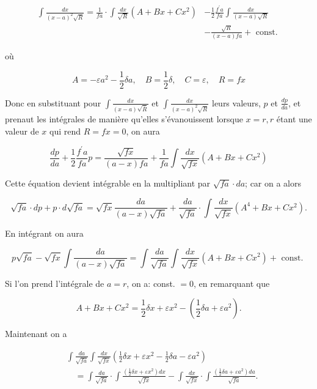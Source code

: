 \documentclass{article}
\begin{document}
\[
\begin{aligned}
\int \frac{d x}{(x-a)^{2} \sqrt{R}}=\frac{1}{f a} \cdot \int \frac{d x}{\sqrt{R}}\left(A+B x+C x^{2}\right) & -\frac{1}{2} \frac{f^{\prime} a}{f a} \int \frac{d x}{(x-a) \sqrt{R}} \\
& -\frac{\sqrt{R}}{(x-a) f a}+\text { const. }
\end{aligned}
\]

où

\[
A=-\varepsilon a^{2}-\frac{1}{2} \delta a, \quad B=\frac{1}{2} \delta, \quad C=\varepsilon, \quad R=f x
\]

Donc en substituant pour \(\int \frac{d x}{(x-a) \sqrt{\bar{R}}}\) et \(\int \frac{d x}{(x-a)^{2} \sqrt{R}}\) leurs valeurs, \(p\) et \(\frac{d p}{d a}\), et prenaut les intégrales de manière qu'elles s'évanouissent lorsque \(x=r, r\) étant une valeur de \(x\) qui rend \(R=f x=0\), on aura

\[
\frac{d p}{d a}+\frac{1}{2} \frac{f^{\prime} a}{f a} p=\frac{\sqrt{f x}}{(a-x) f a}+\frac{1}{f a} \int \frac{d x}{\sqrt{f x}}\left(A+B x+C x^{2}\right)
\]

Cette équation devient intégrable en la multipliant par \(\sqrt{f a} \cdot d a\); car on a alors

\[
\sqrt{f a} \cdot d p+p \cdot d \sqrt{f a}=\sqrt{f x} \frac{d a}{(a-x) \sqrt{f a}}+\frac{d a}{\sqrt{f a}} \cdot \int \frac{d x}{\sqrt{f x}}\left(A^{4}+B x+C x^{2}\right) .
\]

En intégrant on aura

\[
p \sqrt{f a}-\sqrt{f x} \int \frac{d a}{(a-x) \sqrt{f a}}=\int \frac{d a}{\sqrt{f a}} \int \frac{d x}{\sqrt{f x}}\left(A+B x+C x^{2}\right)+\text { const. }
\]

Si l'on prend l'intégrale de \(a=r\), on a: const. \(=0\), en remarquant que

\[
A+B x+C x^{2}=\frac{1}{2} \delta x+\varepsilon x^{2}-\left(\frac{1}{2} \delta a+\varepsilon a^{2}\right) .
\]

Maintenant on a

\[
\begin{aligned}
& \int \frac{d a}{\sqrt{f a}} \int \frac{d x}{\sqrt{f x}}\left(\frac{1}{2} \delta x+\varepsilon x^{2}-\frac{1}{2} \delta a-\varepsilon a^{2}\right) \\
& \quad=\int \frac{d a}{\sqrt{f a}} \cdot \int \frac{\left(\frac{1}{2} \delta x+\varepsilon x^{2}\right) d x}{\sqrt{f x}}-\int \frac{d x}{\sqrt{f x}} \cdot \int \frac{\left(\frac{1}{2} \delta a+\varepsilon a^{2}\right) d a}{\sqrt{f a}} .
\end{aligned}
\]
\end{document}
